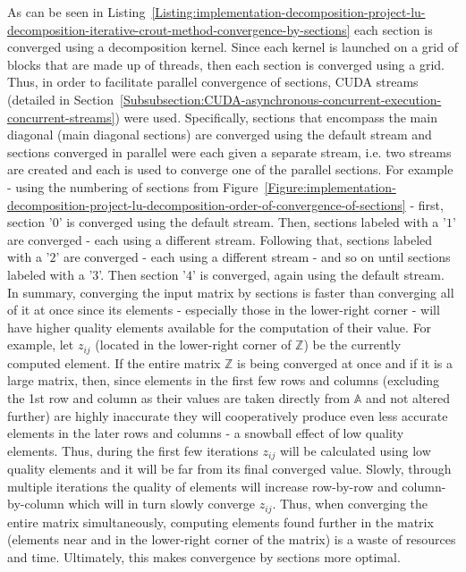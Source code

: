 As can be seen in Listing~\ref{Listing:implementation-decomposition-project-lu-decomposition-iterative-crout-method-convergence-by-sections} each section is converged using a decomposition kernel. Since each kernel is launched on a grid of blocks that are made up of threads, then each section is converged using a grid. Thus, in order to facilitate parallel convergence of sections, CUDA streams (detailed in Section~\ref{Subsubsection:CUDA-asynchronous-concurrent-execution-concurrent-streams}) were used. Specifically, sections that encompass the main diagonal (main diagonal sections) are converged using the default stream and sections converged in parallel were each given a separate stream, i.e. two streams are created and each is used to converge one of the parallel sections. For example - using the numbering of sections from Figure~\ref{Figure:implementation-decomposition-project-lu-decomposition-order-of-convergence-of-sections} - first, section '$ 0 $' is converged using the default stream. Then, sections labeled with a '$ 1 $' are converged - each using a different stream. Following that, sections labeled with a '$ 2 $' are converged - each using a different stream - and so on until sections labeled with a '$ 3 $'. Then section '$ 4 $' is converged, again using the default stream. \\
In summary, converging the input matrix by sections is faster than converging all of it at once since its elements - especially those in the lower-right corner - will have higher quality elements available for the computation of their value. For example, let $ z_{ij} $ (located in the lower-right corner of $ \mathbb{Z} $) be the currently computed element. If the entire matrix $ \mathbb{Z} $ is being converged at once and if it is a large matrix, then, since elements in the first few rows and columns (excluding the 1st row and column as their values are taken directly from $ \mathbb{A} $ and not altered further) are highly inaccurate they will cooperatively produce even less accurate elements in the later rows and columns - a snowball effect of low quality elements. Thus, during the first few iterations $ z_{ij} $ will be calculated using low quality elements and it will be far from its final converged value. Slowly, through multiple iterations the quality of elements will increase row-by-row and column-by-column which will in turn slowly converge $ z_{ij} $. Thus, when converging the entire matrix simultaneously, computing elements found further in the matrix (elements near and in the lower-right corner of the matrix) is a waste of resources and time. Ultimately, this makes convergence by sections more optimal.

